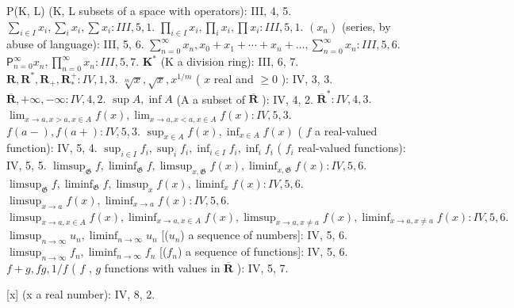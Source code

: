 P(K, L) (K, L subsets of a space with operators): III, 4, 5. \(\sum_{i \in I} x_i, \sum_{i} x_i, \sum x_i: III, 5, 1.\) \(\prod_{i \in I} x_i, \prod_{i} x_i, \prod x_i: III, 5, 1.\) \((x_n)\) (series, by abuse of language): III, 5, 6. \(\sum_{n=0}^{\infty} x_n, x_0 + x_1 + \cdots + x_n + \ldots, \sum_{n=0}^{\infty} x_n: III, 5, 6.\) \(\mathsf{P}_{n=0}^{\infty} x_n, \prod_{n=0}^{\infty} x_n: III, 5, 7.\) \(\mathbf{K}^*\) (K a division ring): III, 6, 7. \(\mathbf{R}, \mathbf{R}^*, \mathbf{R}_+, \mathbf{R}_*^+: IV, 1, 3.\) \(\sqrt[m]{x}, \sqrt{x}, x^{1/m}\) ( \(x\) real and \(\geqslant 0\) ): IV, 3, 3. \(\overline{\mathbf{R}}, +\infty, -\infty: IV, 4, 2.\) \(\sup A, \inf A\) (A a subset of \(\overline{\mathbf{R}}\) ): IV, 4, 2. \(\overline{\mathbf{R}}^*: IV, 4, 3.\) \(\lim_{x \to a, x > a, x \in A} f(x), \lim_{x \to a, x < a, x \in A} f(x): IV, 5, 3.\) \(f(a - ), f(a + ): IV, 5, 3.\) \(\sup_{x \in A} f(x), \inf_{x \in A} f(x)\) ( \(f\) a real-valued function): IV, 5, 4. \(\sup_{i \in I} f_i, \sup_{i} f_i, \inf_{i \in I} f_i, \inf_{i} f_i\) ( \(f_i\) real-valued functions): IV, 5, 5. \(\limsup_{\mathfrak{G}} f, \liminf_{\mathfrak{G}} f, \limsup_{x,\mathfrak{G}} f(x), \liminf_{x,\mathfrak{G}} f(x): IV, 5, 6.\) \(\limsup_{\mathfrak{G}} f, \liminf_{\mathfrak{G}} f, \limsup_{x} f(x), \liminf_{x} f(x): IV, 5, 6.\) \(\limsup_{x \to a} f(x), \liminf_{x \to a} f(x): IV, 5, 6.\) \(\limsup_{x \to a, x \in A} f(x), \liminf_{x \to a, x \in A} f(x), \limsup_{x \to a, x \neq a} f(x), \liminf_{x \to a, x \neq a} f(x): IV, 5, 6.\) \(\limsup_{n \to \infty} u_n, \liminf_{n \to \infty} u_n\) {[}(\(u_n\)) a sequence of numbers{]}: IV, 5, 6. \(\limsup_{n \to \infty} f_n, \liminf_{n \to \infty} f_n\) {[}(\(f_n\)) a sequence of functions{]}: IV, 5, 6. \(f + g, fg, 1/f\) ( \(f\) , \(g\) functions with values in \(\overline{\mathbf{R}}\) ): IV, 5, 7.

{[}x{]} (x a real number): IV, 8, 2.


